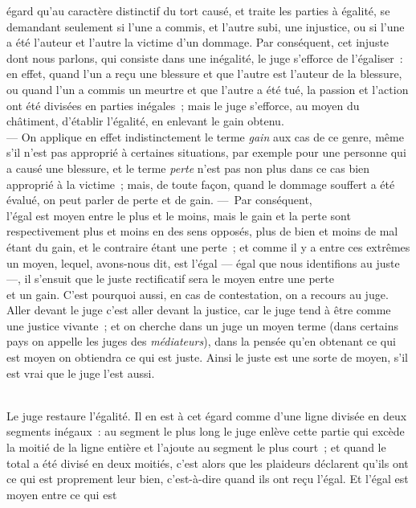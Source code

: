 \documentclass[french,twoside]{book} %
\begin{document}
égard qu’au caractère distinctif du tort causé, et traite les parties à égalité, se demandant seulement si l’une a commis, et l’autre subi, une injustice, ou si l’une a été l’auteur et l’autre la victime d’un dommage. Par conséquent, cet injuste dont nous parlons, qui consiste dans une inégalité, le juge s’efforce de l’égaliser : en effet, quand l’un a reçu une blessure et que l’autre est l’auteur de la blessure, ou quand l’un a commis un meurtre et que l’autre a été tué, la passion et l’action ont été divisées en parties inégales ; mais le juge s’efforce, au moyen du châtiment, d’établir l’égalité, en enlevant le gain obtenu. \\
— On applique en effet indistinctement le terme {\itshape gain} aux cas de ce genre, même s’il n’est pas approprié à certaines situations, par exemple pour une personne qui a causé une blessure, et le terme {\itshape perte} n’est pas non plus dans ce cas bien approprié à la victime ; mais, de toute façon, quand le dommage souffert a été évalué, on peut parler de perte et de gain. — Par conséquent, \\
l’égal est moyen entre le plus et le moins, mais le gain et la perte sont respectivement plus et moins en des sens opposés, plus de bien et moins de mal étant du gain, et le contraire étant une perte ; et comme il y a entre ces extrêmes un moyen, lequel, avons-nous dit, est l’égal — égal que nous identifions au juste —, il s’ensuit que le juste rectificatif sera le moyen entre une perte \\
et un gain. C’est pourquoi aussi, en cas de contestation, on a recours au juge. Aller devant le juge c’est aller devant la justice, car le juge tend à être comme une justice vivante ; et on cherche dans un juge un moyen terme (dans certains pays on appelle les juges des {\itshape médiateurs}), dans la pensée qu’en obtenant ce qui est moyen on obtiendra ce qui est juste. Ainsi le juste est une sorte de moyen, s’il est vrai que le juge l’est aussi.\par
\\
Le juge restaure l’égalité. Il en est à cet égard comme d’une ligne divisée en deux segments inégaux : au segment le plus long le juge enlève cette partie qui excède la moitié de la ligne entière et l’ajoute au segment le plus court ; et quand le total a été divisé en deux moitiés, c’est alors que les plaideurs déclarent qu’ils ont ce qui est proprement leur bien, c’est-à-dire quand ils ont reçu l’égal. Et l’égal est moyen entre ce qui est \\
\end{document}
